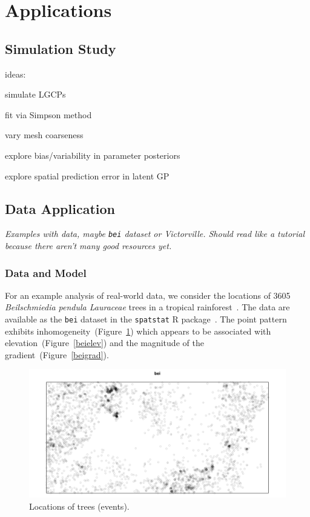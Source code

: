 \documentclass[]{interact}
\begin{document}
\section{Applications}


\subsection{Simulation Study}

ideas:

simulate LGCPs

fit via Simpson method

vary mesh coarseness

explore bias/variability in parameter posteriors

explore spatial prediction error in latent GP


\subsection{Data Application}

{\it Examples with data, maybe \texttt{bei} dataset or Victorville. Should read
like a tutorial because there aren't many good resources yet.}

\subsubsection{Data and Model}

For an example analysis of real-world data, we consider the locations of
3605 \emph{Beilschmiedia pendula Lauraceae} trees in a tropical
rainforest~\cite{moellerwaagepetersen}. The data are available as the
\texttt{bei} dataset in the \texttt{spatstat} R package~\cite{spatstat}.
The point pattern exhibits inhomogeneity~(Figure~\ref{bei}) which appears
to be associated with elevation~(Figure~\ref{beielev}) and the magnitude of
the gradient~(Figure~\ref{beigrad}).

\begin{figure}[h]
\includegraphics[width=\textwidth]{figures/bei.pdf}
\caption{Locations of trees (events).}
\label{bei}
\end{figure}
\end{document}
